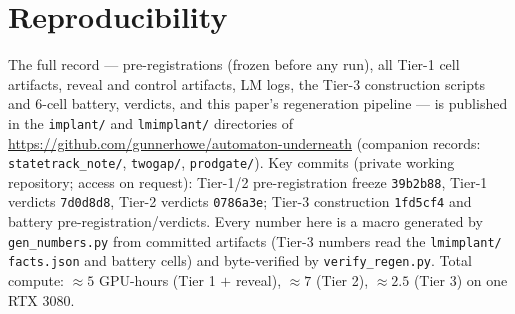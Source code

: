 \documentclass[10pt]{article}
\begin{document}
\section{Reproducibility}
The full record --- pre-registrations (frozen before any run), all Tier-1 cell artifacts, reveal
and control artifacts, LM logs, the Tier-3 construction scripts and $6$-cell battery, verdicts, and
this paper's regeneration pipeline --- is published in the \texttt{implant/} and \texttt{lmimplant/}
directories of \url{https://github.com/gunnerhowe/automaton-underneath} (companion records:
\texttt{statetrack\_note/}, \texttt{twogap/}, \texttt{prodgate/}). Key commits (private working
repository; access on request): Tier-1/2 pre-registration freeze \texttt{39b2b88}, Tier-1 verdicts
\texttt{7d0d8d8}, Tier-2 verdicts \texttt{0786a3e}; Tier-3 construction \texttt{1fd5cf4} and
battery pre-registration/verdicts. Every number here is a macro generated by
\texttt{gen\_numbers.py} from committed artifacts (Tier-3 numbers read the \texttt{lmimplant/}
\texttt{facts.json} and battery cells) and byte-verified by \texttt{verify\_regen.py}. Total
compute: $\approx5$ GPU-hours (Tier 1 $+$ reveal), $\approx7$ (Tier 2), $\approx2.5$ (Tier 3) on
one RTX 3080.



\end{document}
